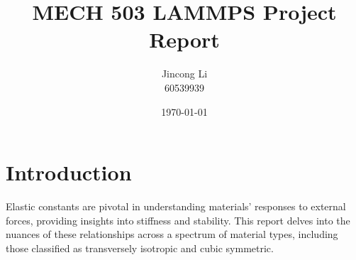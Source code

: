 \documentclass[a4paper,11pt]{article} %
\begin{document}
\setlength{\parskip}{1em} 
\setlength{\parindent}{0pt}
\newcommand{\vect}[1]{\mathbf{#1}}

\title{MECH 503 LAMMPS Project Report}
\author{Jincong Li \\ 60539939}
\date{\today}
\maketitle

\section*{Introduction}
Elastic constants are pivotal in understanding materials' responses to external forces, 
providing insights into stiffness and stability. This report delves into the nuances of these relationships 
across a spectrum of material types, including those classified as transversely isotropic and cubic symmetric.






\end{document}
